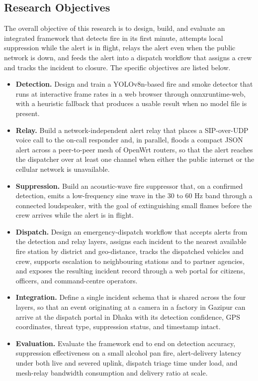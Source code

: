 \subsection{Research Objectives}

The overall objective of this research is to design, build, and evaluate an integrated framework that detects fire in its first minute, attempts local suppression while the alert is in flight, relays the alert even when the public network is down, and feeds the alert into a dispatch workflow that assigns a crew and tracks the incident to closure. The specific objectives are listed below.

\begin{itemize}
\item \textbf{Detection.} Design and train a YOLOv8n-based fire and smoke detector that runs at interactive frame rates in a web browser through onnxruntime-web, with a heuristic fallback that produces a usable result when no model file is present.
\item \textbf{Relay.} Build a network-independent alert relay that places a SIP-over-UDP voice call to the on-call responder and, in parallel, floods a compact JSON alert across a peer-to-peer mesh of OpenWrt routers, so that the alert reaches the dispatcher over at least one channel when either the public internet or the cellular network is unavailable.
\item \textbf{Suppression.} Build an acoustic-wave fire suppressor that, on a confirmed detection, emits a low-frequency sine wave in the 30 to 60 Hz band through a connected loudspeaker, with the goal of extinguishing small flames before the crew arrives while the alert is in flight.
\item \textbf{Dispatch.} Design an emergency-dispatch workflow that accepts alerts from the detection and relay layers, assigns each incident to the nearest available fire station by district and geo-distance, tracks the dispatched vehicles and crew, supports escalation to neighbouring stations and to partner agencies, and exposes the resulting incident record through a web portal for citizens, officers, and command-centre operators.
\item \textbf{Integration.} Define a single incident schema that is shared across the four layers, so that an event originating at a camera in a factory in Gazipur can arrive at the dispatch portal in Dhaka with its detection confidence, GPS coordinates, threat type, suppression status, and timestamp intact.
\item \textbf{Evaluation.} Evaluate the framework end to end on detection accuracy, suppression effectiveness on a small alcohol pan fire, alert-delivery latency under both live and severed uplink, dispatch triage time under load, and mesh-relay bandwidth consumption and delivery ratio at scale.
\end{itemize}

